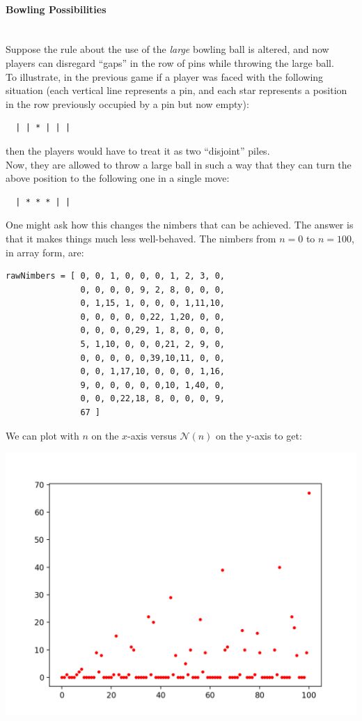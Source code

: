 \documentclass{article}
\newcommand{\I}[1]{\textit{#1}}
\newcommand{\nim}{\mathcal{N}}
\begin{document}
\paragraph{Bowling Possibilities}\mbox{}\\
Suppose the rule about the use of the \I{large} bowling ball
is altered, and now players can disregard ``gaps'' in the row
of pins while throwing the large ball. \\
To illustrate, in the previous game if a player was faced with
the following situation (each vertical line represents a pin, and
each star represents a position in the row previously occupied by
a pin but now empty):
\begin{verbatim}
  | | * | | |
\end{verbatim}
then the players would have to treat it as two ``disjoint'' piles. \\
Now, they are allowed to throw a large ball in such a way that
they can turn the above position to the following one in a single
move:
\begin{verbatim}
  | * * * | |
\end{verbatim}
One might ask how this changes the nimbers that can be achieved. The
answer is that it makes things much less well-behaved. The nimbers
from $n = 0$ to $n = 100$, in array form, are:
\begin{verbatim}
rawNimbers = [ 0, 0, 1, 0, 0, 0, 1, 2, 3, 0, 
               0, 0, 0, 0, 9, 2, 8, 0, 0, 0, 
               0, 1,15, 1, 0, 0, 0, 1,11,10, 
               0, 0, 0, 0, 0,22, 1,20, 0, 0, 
               0, 0, 0, 0,29, 1, 8, 0, 0, 0, 
               5, 1,10, 0, 0, 0,21, 2, 9, 0, 
               0, 0, 0, 0, 0,39,10,11, 0, 0, 
               0, 0, 1,17,10, 0, 0, 0, 1,16,
               9, 0, 0, 0, 0, 0,10, 1,40, 0,
               0, 0, 0,22,18, 8, 0, 0, 0, 9,
               67 ]
\end{verbatim}
We can plot with $n$ on the $x$-axis versus $\nim(n)$ on the y-axis to get:
\begin{center}
  \includegraphics[scale=0.7]{bowlingScatter}
\end{center}
\end{document}

